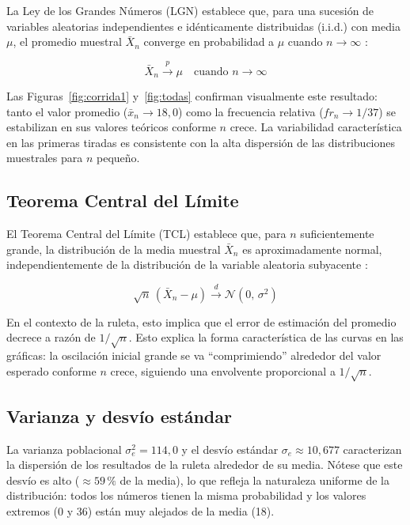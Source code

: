 \documentclass[a4paper, 11pt]{article}
\begin{document}
La Ley de los Grandes Números (LGN) establece que, para una sucesión de
variables aleatorias independientes e idénticamente distribuidas (i.i.d.)
con media $\mu$, el promedio muestral $\bar{X}_n$ converge en probabilidad
a $\mu$ cuando $n \to \infty$ \cite{devore2016probabilidad}:

\begin{equation}
  \bar{X}_n \xrightarrow{p} \mu \quad \text{cuando } n \to \infty
  \label{eq:lgn}
\end{equation}

Las Figuras~\ref{fig:corrida1} y~\ref{fig:todas} confirman visualmente este
resultado: tanto el valor promedio ($\bar{x}_n \to 18{,}0$) como la
frecuencia relativa ($fr_n \to 1/37$) se estabilizan en sus valores teóricos
conforme $n$ crece. La variabilidad característica en las primeras tiradas
es consistente con la alta dispersión de las distribuciones muestrales para
$n$ pequeño.

\subsection{Teorema Central del Límite}

El Teorema Central del Límite (TCL) establece que, para $n$ suficientemente
grande, la distribución de la media muestral $\bar{X}_n$ es aproximadamente
normal, independientemente de la distribución de la variable aleatoria
subyacente \cite{ross2014introduction}:

\begin{equation}
  \sqrt{n}\,(\bar{X}_n - \mu) \xrightarrow{d} \mathcal{N}(0,\, \sigma^2)
  \label{eq:tcl}
\end{equation}

En el contexto de la ruleta, esto implica que el error de estimación del
promedio decrece a razón de $1/\sqrt{n}$. Esto explica la forma característica
de las curvas en las gráficas: la oscilación inicial grande se va
``comprimiendo'' alrededor del valor esperado conforme $n$ crece, siguiendo
una envolvente proporcional a $1/\sqrt{n}$.

\subsection{Varianza y desvío estándar}

La varianza poblacional $\sigma^2_e = 114{,}0$ y el desvío estándar
$\sigma_e \approx 10{,}677$ caracterizan la dispersión de los resultados
de la ruleta alrededor de su media. Nótese que este desvío es alto
($\approx 59\,\%$ de la media), lo que refleja la naturaleza uniforme de la
distribución: todos los números tienen la misma probabilidad y los valores
extremos (0 y 36) están muy alejados de la media (18).
\end{document}
